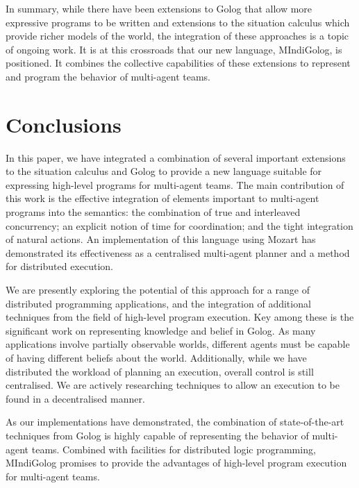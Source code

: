 \documentclass[letterpaper]{article}
\begin{document}
In summary, while there have been extensions to Golog that allow more
expressive programs to be written and extensions to the situation
calculus which provide richer models of the world, the integration
of these approaches is a topic of ongoing work. It is at this crossroads
that our new language, MIndiGolog, is positioned. It combines the
collective capabilities of these extensions to represent and program
the behavior of multi-agent teams.


\section{Conclusions}

\label{sec:Conclusions-and-Future}

In this paper, we have integrated a combination of several important
extensions to the situation calculus and Golog to provide a new language
suitable for expressing high-level programs for multi-agent teams.
The main contribution of this work is the effective integration of
elements important to multi-agent programs into the semantics: the
combination of true and interleaved concurrency; an explicit notion
of time for coordination; and the tight integration of natural actions.
An implementation of this language using Mozart has demonstrated its
effectiveness as a centralised multi-agent planner and a method for
distributed execution. 

We are presently exploring the potential of this approach for a range
of distributed programming applications, and the integration of additional
techniques from the field of high-level program execution. Key among
these is the significant work on representing knowledge and belief
in Golog. As many applications involve partially observable worlds,
different agents must be capable of having different beliefs about
the world. Additionally, while we have distributed the workload of
planning an execution, overall control is still centralised. We are
actively researching techniques to allow an execution to be found
in a decentralised manner.

As our implementations have demonstrated, the combination of state-of-the-art
techniques from Golog is highly capable of representing the behavior
of multi-agent teams. Combined with facilities for distributed logic
programming, MIndiGolog promises to provide the advantages of high-level
program execution for multi-agent teams.



\end{document}
